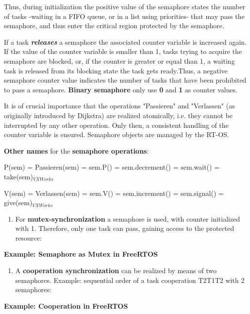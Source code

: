 Thus, during initialization the positive value of the semaphore states the number of tasks -waiting in a FIFO queue, or in a list using priorities- that may pass the semaphore, and thus enter the critical region protected by the semaphore.

If a task \textbf{\textit{releases}} a semaphore the associated counter variable is increased again. If the value of the counter variable is smaller than 1, tasks trying to acquire the semaphore are blocked, or, if the counter is greater or equal than 1, a waiting task is released from its blocking state  the task gets ready.Thus, a negative semaphore counter value indicates the number of tasks that have been prohibited to pass a semaphore. \textbf{Binary semaphore} only use \textbf{0} and \textbf{1} as counter values.

It is of crucial importance that the operations "Passieren" and "Verlassen" (as originally introduced by Dijkstra) are realized atomically, i.e. they cannot be interrupted by any other operation. Only then, a consistent handling of the counter variable is ensured. Semaphore objects are managed by the RT-OS.

\textbf{Other names} for the \textbf{semaphore operations}:

P(sem) = Passieren(sem) = sem.P() = sem.decrement() = sem.wait() = take(sem)${}_{VXWorks}$

V(sem) = Verlassen(sem) = sem.V() = sem.increment()  = sem.signal() = give(sem)${}_{VXWorks}$

\begin{enumerate}
\item  For \textbf{mutex-synchronization} a semaphore is used, with counter initialized with 1. Therefore, only one task can pass, gaining access to the protected resource: 
\end{enumerate}

\textbf{Example: Semaphore as Mutex in FreeRTOS}

\begin{enumerate}
\item  A \textbf{cooperation synchronization} can be realized by means of two semaphores. Example: sequential order of a task cooperation T2T1T2 with 2 semaphores:
\end{enumerate}

\textbf{Example: Cooperation in FreeRTOS  }
